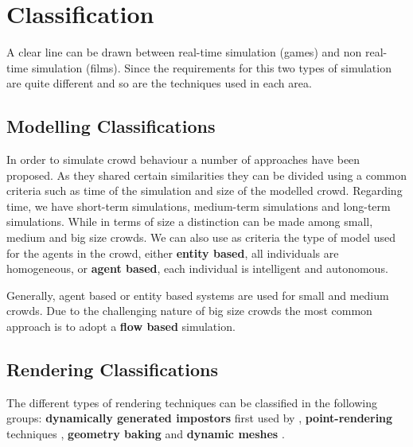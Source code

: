 \documentclass[conference]{acmsiggraph}
\begin{document}
\section{Classification}

A clear line can be drawn between real-time simulation (games) and non real-time simulation (films).
Since the requirements for this two types of simulation are quite different and so are the techniques used in each area.

\subsection{Modelling Classifications}

In order to simulate crowd behaviour a number of approaches have been proposed.
As they shared certain similarities they can be divided using a common criteria such as time of the simulation and size of the modelled crowd.
Regarding time, we have short-term simulations, medium-term simulations and long-term simulations.
While in terms of size a distinction can be made among small, medium and big size crowds.
We can also use as criteria the type of model used for the agents in the crowd, either \textbf{entity based}, all individuals are homogeneous, or \textbf{agent based}, each individual is intelligent and autonomous.

Generally, agent based or entity based systems are used for small and medium crowds.
Due to the challenging nature of big size crowds the most common approach is to adopt a \textbf{flow based} simulation.

\subsection{Rendering Classifications}

The different types of rendering techniques can be classified in the following groups: \textbf{dynamically generated impostors} first used by  \cite{Aubel2000}, \textbf{point-rendering} techniques \cite{Wand2002}, \textbf{geometry baking} \cite{Ulicny2004} and \textbf{dynamic meshes} \cite{Ciechomski2005}.

%
\end{document}
